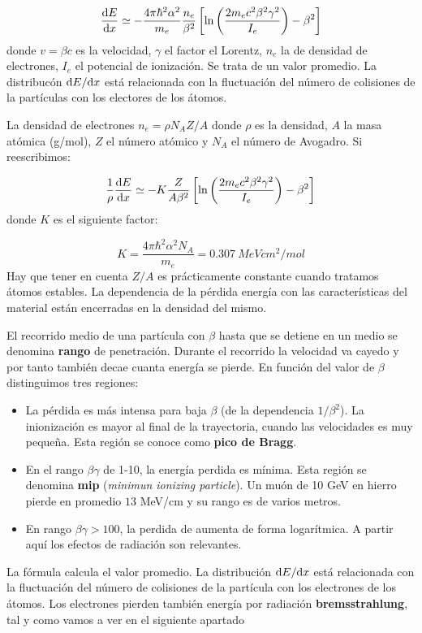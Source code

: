 \begin{equation}
	\frac{\mathrm{d} E}{\mathrm{d} x} \simeq - \frac{4\pi \hbar^2 \alpha^2}{m_e} \frac{n_e}{\beta^2} \left[ \ln \left( \frac{2m_e c^2 \beta^2 \gamma^2}{I_e} \right) - \beta^2 \right]
\end{equation}
donde $v=\beta c$ es la velocidad, $\gamma$ el factor el Lorentz, $n_e$ la de densidad de electrones, $I_e$ el potencial de ionización. Se trata de un valor promedio. La distribucón $\mathrm{d} E / \mathrm{d} x$ está relacionada con la fluctuación del número de colisiones de la partículas con los electores de los átomos.

La densidad de electrones $n_e=\rho N_A Z/A$ donde $\rho$ es la densidad, $A$ la masa atómica (g/mol), $Z$ el número atómico y $N_A$ el número de Avogadro. Si reescribimos:

\begin{equation}
	\frac{1}{\rho} \frac{\mathrm{d} E}{\mathrm{d} x} \simeq - K \frac{Z}{A\beta^2} \left[ \ln \left( \frac{2m_ec^2\beta^2 \gamma^2}{I_e} \right) - \beta^2 \right]
\end{equation}
donde $K$ es el siguiente factor:

\begin{equation}
	K = \frac{4\pi \hbar^2 \alpha^2 N_A}{m_e} = 0.307 \ \unit{MeV cm^2 / mol}
\end{equation}
Hay que tener en cuenta $Z/A$ es prácticamente constante cuando tratamos átomos estables. La dependencia de la pérdida energía con las características del material están encerradas en la densidad del mismo.

El recorrido medio de una partícula con $\beta$ hasta que se detiene en un medio se denomina \textbf{rango} de penetración. Durante el recorrido la velocidad va cayedo y por tanto también decae cuanta energía se pierde. En función del valor de $\beta$  distinguimos tres regiones:

\begin{itemize}
	\item La pérdida es más intensa para baja $\beta$ (de la dependencia $1/\beta^2$). La inionización es mayor al final de la trayectoria, cuando las velocidades es muy pequeña. Esta región se conoce como \textbf{pico de Bragg}.
	\item En el rango $\beta \gamma$ de 1-10, la energía perdida es mínima. Esta región se denomina \textbf{mip} (\textit{minimun ionizing particle}). Un muón de 10 GeV en hierro pierde en promedio $13$ MeV/cm y su rango es de varios metros. 
	\item En rango $\beta \gamma>100$, la perdida de aumenta de forma logarítmica. A partir aquí los efectos de radiación son relevantes.
\end{itemize}
La fórmula calcula el valor promedio. La distribución $\mathrm{d} E / \mathrm{d} x$ está relacionada con la fluctuación del número de colisiones de la partícula con los electrones de los átomos. Los electrones pierden también energía por radiación \textbf{bremsstrahlung}, tal y como vamos a ver en el siguiente apartado

